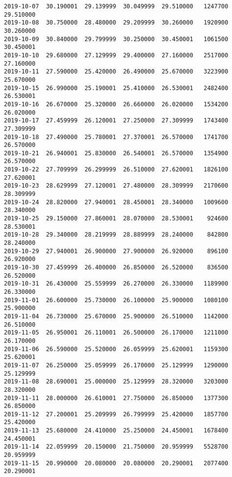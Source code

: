 \documentclass[11pt]{article}
\begin{document}
\begin{Verbatim}[commandchars=\\\{\}]
2019-10-07  30.190001  29.139999  30.049999  29.510000   1247700  29.510000
2019-10-08  30.750000  28.480000  29.209999  30.260000   1920900  30.260000
2019-10-09  30.840000  29.799999  30.250000  30.450001   1061500  30.450001
2019-10-10  29.680000  27.129999  29.400000  27.160000   2517000  27.160000
2019-10-11  27.590000  25.420000  26.490000  25.670000   3223900  25.670000
2019-10-15  26.990000  25.190001  25.410000  26.530001   2482400  26.530001
2019-10-16  26.670000  25.320000  26.660000  26.020000   1534200  26.020000
2019-10-17  27.459999  26.120001  27.250000  27.309999   1743400  27.309999
2019-10-18  27.490000  25.780001  27.370001  26.570000   1741700  26.570000
2019-10-21  26.940001  25.830000  26.540001  26.570000   1354900  26.570000
2019-10-22  27.709999  26.299999  26.510000  27.620001   1826100  27.620001
2019-10-23  28.629999  27.120001  27.480000  28.309999   2170600  28.309999
2019-10-24  28.820000  27.940001  28.450001  28.340000   1009600  28.340000
2019-10-25  29.150000  27.860001  28.070000  28.530001    924600  28.530001
2019-10-28  29.340000  28.219999  28.889999  28.240000    842800  28.240000
2019-10-29  27.940001  26.900000  27.900000  26.920000    896100  26.920000
2019-10-30  27.459999  26.400000  26.850000  26.520000    836500  26.520000
2019-10-31  26.430000  25.559999  26.270000  26.330000   1189900  26.330000
2019-11-01  26.600000  25.730000  26.100000  25.900000   1080100  25.900000
2019-11-04  26.730000  25.670000  25.900000  26.510000   1142000  26.510000
2019-11-05  26.950001  26.110001  26.500000  26.170000   1211000  26.170000
2019-11-06  26.590000  25.520000  26.059999  25.620001   1159300  25.620001
2019-11-07  26.250000  25.059999  26.170000  25.129999   1290000  25.129999
2019-11-08  28.690001  25.000000  25.129999  28.320000   3203000  28.320000
2019-11-11  28.000000  26.610001  27.750000  26.850000   1377300  26.850000
2019-11-12  27.200001  25.209999  26.799999  25.420000   1857700  25.420000
2019-11-13  25.680000  24.410000  25.250000  24.450001   1678400  24.450001
2019-11-14  22.059999  20.150000  21.750000  20.959999   5528700  20.959999
2019-11-15  20.990000  20.080000  20.080000  20.290001   2077400  20.290001


\end{Verbatim}
\end{document}
